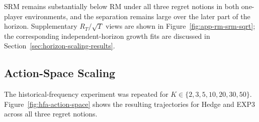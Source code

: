 SRM remains substantially below RM under all three regret notions in both
one-player environments, and the separation remains large over the later part
of the horizon. Supplementary \(R_T/\sqrt{T}\) views are shown in
Figure~\ref{fig:app-rm-srm-sqrt}; the corresponding independent-horizon
growth fits are discussed in Section~\ref{sec:horizon-scaling-results}.


\subsection{Action-Space Scaling}
\label{sec:action-space-scaling-results}

The historical-frequency experiment was repeated for
\(K\in\{2,3,5,10,20,30,50\}\). Figure~\ref{fig:hfa-action-space} shows the
resulting trajectories for Hedge and EXP3 across all three regret notions.

